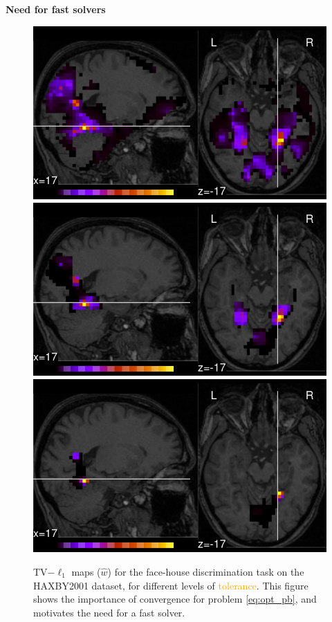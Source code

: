 \documentclass[french]{STIC_poster}
\begin{document}
\begin{frame}[t]
\begin{columns}[t]
\begin{column}{.48\linewidth}
				\begin{nbox}[\textwidth]{\textbf{Need for fast solvers}}
                                  \begin{figure}
                                    \includegraphics[width=.32\linewidth]{maps/face_vs_house_tol_0_1.pdf}%
                                    \hfill%
                                    \includegraphics[width=.32\linewidth]{maps/face_vs_house_tol_0_001.pdf}%
                                    \hfill%
                                    \includegraphics[width=.32\linewidth]{maps/face_vs_house_tol_1e-05.pdf}%
                                    \caption{TV$-\ell_1$ maps ($\hat{w}$) for the face-house discrimination task on
                                      the HAXBY2001 dataset, for different levels of \textcolor{orange}{tolerance}.
                                      This figure shows the importance of convergence for problem \eqref{eq:opt_pb}, and motivates
                                      the need for a fast solver.}%
                                    \label{fig:maps_tolerance}
                                  \end{figure}


\end{nbox}
\end{column}
\end{columns}
\end{frame}
\end{document}
